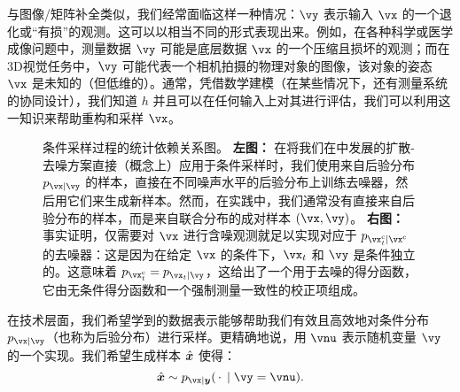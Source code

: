 \documentclass[../../book-main_zh.tex]{subfiles}
\begin{document}
与图像/矩阵补全类似，我们经常面临这样一种情况：$\vy$ 表示输入 $\vx$ 的一个退化或“有损”的观测。这可以以相当不同的形式表现出来。例如，在各种科学或医学成像问题中，测量数据 $\vy$ 可能是底层数据 $\vx$ 的一个压缩且损坏的观测；而在3D视觉任务中，$\vy$ 可能代表一个相机拍摄的物理对象的图像，该对象的姿态 $\vx$ 是未知的（但低维的）。通常，凭借数学建模（在某些情况下，还有测量系统的协同设计），我们知道 $h$ 并且可以在任何输入上对其进行评估，我们可以利用这一知识来帮助重构和采样 $\vx$。

\begin{figure}[t]
  \centering
  \begin{subfigure}{0.45\textwidth}
    \vspace{0.75cm}
    \centering
    \vspace{0.75cm}
    \caption{}
    \label{fig:left}
  \end{subfigure}
  \hfill
  \begin{subfigure}{0.45\textwidth}
    \centering
    \caption{}
    \label{fig:right}
  \end{subfigure}
  \caption{条件采样过程的统计依赖关系图。
  \textbf{左图：} 在将我们在中发展的扩散-去噪方案直接（概念上）应用于条件采样时，我们使用来自后验分布 $p_{\vx \mid \vy}$ 的样本，直接在不同噪声水平的后验分布上训练去噪器，然后用它们来生成新样本。然而，在实践中，我们通常没有直接来自后验分布的样本，而是来自联合分布的成对样本 $(\vx, \vy)$。
  \textbf{右图：} 事实证明，仅需要对 $\vx$ 进行含噪观测就足以实现对应于 $p_{\posteriorsample_t \mid \posteriorsample}$ 的去噪器：这是因为在给定 $\vx$ 的条件下，$\vx_t$ 和 $\vy$ 是条件独立的。这意味着 $p_{\posteriorsample_t} = p_{\vx_t \mid \vy}$，这给出了一个用于去噪的得分函数，它由无条件得分函数和一个强制测量一致性的校正项组成。}
  \label{fig:posterior-sampling-cds}
\end{figure}


在技术层面，我们希望学到的数据表示能够帮助我们有效且高效地对条件分布 $p_{\vx\mid \vy}$（也称为后验分布）进行采样。更精确地说，用 $\vnu$ 表示随机变量 $\vy$ 的一个实现。我们希望生成样本 $\hat{\bm{x}}$ 使得：
\begin{equation}\label{eq:goal-sample-posterior}
  \hat{\x} \sim   p_{\vx \mid \y}(\spcdot \mid \vy=\vnu).
\end{equation}
\end{document}
